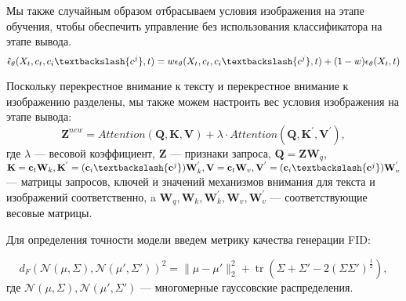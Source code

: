 \documentclass{article}
\begin{document}
Мы также случайным образом отбрасываем условия изображения на этапе обучения, чтобы обеспечить управление без использования классификатора на этапе вывода. 
$$ \hat{\epsilon}_{\theta}(X_t, c_t, c_{i} \textbackslash \{c^j\}, t) = w\epsilon_{\theta}(X_t, c_t, c_{i} \textbackslash \{c^j\}, t) + (1-w)\epsilon_{\theta}(X_t, t)$$

Поскольку перекрестное внимание к тексту и перекрестное внимание к изображению разделены, мы также можем настроить вес условия изображения на этапе вывода: 
$$ \mathbf{Z}^{new} = Attention(\mathbf{Q}, \mathbf{K}, \mathbf{V}) + \lambda \cdot Attention(\mathbf{Q}, \mathbf{K}^{'}, \mathbf{V}^{'}), $$ 
где $\lambda$ --- весовой коэффициент, $\mathbf{Z}$ --- признаки запроса, $\mathbf{Q} = \mathbf{Z}\mathbf{W}_q$, $\mathbf{K} = \mathbf{c}_t\mathbf{W}_k, \mathbf{K}^{'} = (\mathbf{c}_i \textbackslash \{\mathbf{c}^j\}) {\mathbf{W}}^{'}_k, \mathbf{V} = \mathbf{c}_t\mathbf{W}_v, \mathbf{V}^{'} = (\mathbf{c}_i \textbackslash \{\mathbf{c}^j\}){\mathbf{W}}^{'}_v$ --- матрицы запросов, ключей и значений механизмов внимания для текста и изображений соответственно, a $\mathbf{W}_q, \mathbf{W}_k, {\mathbf{W}}^{'}_k, \mathbf{W}_v, {\mathbf{W}}^{'}_v$ --- соответствующие весовые матрицы. 

Для определения точности модели введем метрику качества генерации FID: 

$$d_{F}(\mathcal N(\mu, \Sigma), \mathcal N(\mu', \Sigma'))^2 = \lVert \mu - \mu' \rVert^2_2 + \operatorname{tr}\left(\Sigma + \Sigma' -2\left(\Sigma \Sigma'  \right)^\frac{1}{2} \right),$$
где $\mathcal N(\mu, \Sigma), \mathcal N(\mu', \Sigma')$ --- многомерные гауссовские распределения. 



\end{document}
